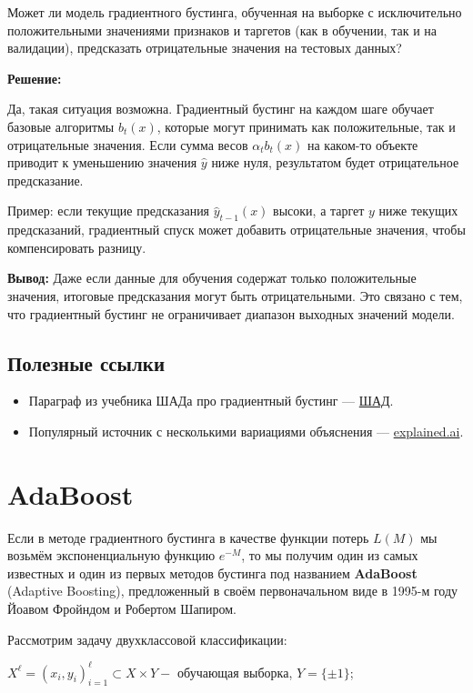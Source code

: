 Может ли модель градиентного бустинга, обученная на выборке с исключительно положительными значениями признаков и таргетов (как в обучении, так и на валидации), предсказать отрицательные значения на тестовых данных?

\textbf{Решение:}

Да, такая ситуация возможна. Градиентный бустинг на каждом шаге обучает базовые алгоритмы $b_t(x)$, которые могут принимать как положительные, так и отрицательные значения. Если сумма весов $\alpha_t b_t(x)$ на каком-то объекте приводит к уменьшению значения $\hat{y}$ ниже нуля, результатом будет отрицательное предсказание.

Пример: если текущие предсказания $\hat{y}_{t-1}(x)$ высоки, а таргет $y$ ниже текущих предсказаний, градиентный спуск может добавить отрицательные значения, чтобы компенсировать разницу.

\textbf{Вывод:} Даже если данные для обучения содержат только положительные значения, итоговые предсказания могут быть отрицательными. Это связано с тем, что градиентный бустинг не ограничивает диапазон выходных значений модели.

\subsection{Полезные ссылки}
\begin{itemize}
    \item Параграф из учебника ШАДа про градиентный бустинг — \href{https://education.yandex.ru/handbook/ml/article/gradientnyj-busting}{ШАД}.
    \item Популярный источник с несколькими вариациями объяснения — \href{https://explained.ai/gradient-boosting/}{explained.ai}.
\end{itemize}
\section{AdaBoost}

Если в методе градиентного бустинга в качестве функции потерь $L(M)$ мы возьмём экспоненциальную функцию $e^{-M}$, то мы получим один из самых известных и один из первых методов бустинга под названием \textbf{AdaBoost} (Adaptive Boosting), предложенный в своём первоначальном виде в 1995-м году Йоавом Фройндом и Робертом Шапиром.

Рассмотрим задачу двухклассовой классификации:

\noindent $X^{\ell}=\left(x_i, y_i\right)_{i=1}^{\ell} \subset X \times Y-$ обучающая выборка, $Y=\{ \pm 1\}$;

